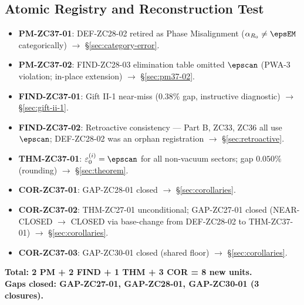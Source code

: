 \documentclass[12pt, a4paper]{article}
\begin{document}
\subsection{Atomic Registry and Reconstruction Test}
\label{sec:registry}

\begin{formalbox}[title={Atomic Units Introduced by TASK-ZC37
  (8 units)}]
\begin{itemize}[leftmargin=*,noitemsep]
  \item \textbf{PM-ZC37-01}: DEF-ZC28-02 retired as Phase
    Misalignment ($\alpha_{R_0} \neq \epsEM$ categorically)
    $\to$ \S\ref{sec:category-error}.
  \item \textbf{PM-ZC37-02}: FIND-ZC28-03 elimination table
    omitted $\epscan$ (PWA-3 violation; in-place extension)
    $\to$ \S\ref{sec:pm37-02}.
  \item \textbf{FIND-ZC37-01}: Gift II-1 near-miss
    ($0.38\%$ gap, instructive diagnostic)
    $\to$ \S\ref{sec:gift-ii-1}.
  \item \textbf{FIND-ZC37-02}: Retroactive consistency ---
    Part B, ZC33, ZC36 all use $\epscan$; DEF-ZC28-02 was
    an orphan registration
    $\to$ \S\ref{sec:retroactive}.
  \item \textbf{THM-ZC37-01}: $\varepsilon_0^{(i)} = \epscan$
    for all non-vacuum sectors; gap $0.050\%$ (rounding)
    $\to$ \S\ref{sec:theorem}.
  \item \textbf{COR-ZC37-01}: GAP-ZC28-01 closed
    $\to$ \S\ref{sec:corollaries}.
  \item \textbf{COR-ZC37-02}: THM-ZC27-01 unconditional;
    GAP-ZC27-01 closed (NEAR-CLOSED $\to$ CLOSED via
    base-change from DEF-ZC28-02 to THM-ZC37-01)
    $\to$ \S\ref{sec:corollaries}.
  \item \textbf{COR-ZC37-03}: GAP-ZC30-01 closed (shared floor)
    $\to$ \S\ref{sec:corollaries}.
\end{itemize}
\textbf{Total: 2 PM + 2 FIND + 1 THM + 3 COR = 8 new units.}\\
\textbf{Gaps closed: GAP-ZC27-01, GAP-ZC28-01, GAP-ZC30-01 (3 closures).}
\end{formalbox}
\end{document}
